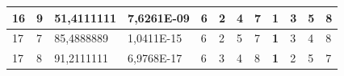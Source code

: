\documentclass[conference]{IEEEtran}
\begin{document}
\begin{table}[]
\begin{tabular}{|llll|llllllll|}
\multicolumn{1}{|l|}{16}                                                    & \multicolumn{1}{l|}{9}                                                        & \multicolumn{1}{l|}{51,4111111}                                                   & 7,6261E-09                     & \multicolumn{1}{l|}{6}                                                  & \multicolumn{1}{l|}{2}                                                  & \multicolumn{1}{l|}{4}                                                  & \multicolumn{1}{l|}{7}                                                  & \multicolumn{1}{l|}{\textbf{1}}                                         & \multicolumn{1}{l|}{3}                                                  & \multicolumn{1}{l|}{5}                                                  & 8                          \\ \hline
\multicolumn{1}{|l|}{17}                                                    & \multicolumn{1}{l|}{7}                                                        & \multicolumn{1}{l|}{85,4888889}                                                   & 1,0411E-15                     & \multicolumn{1}{l|}{6}                                                  & \multicolumn{1}{l|}{2}                                                  & \multicolumn{1}{l|}{5}                                                  & \multicolumn{1}{l|}{7}                                                  & \multicolumn{1}{l|}{\textbf{1}}                                         & \multicolumn{1}{l|}{3}                                                  & \multicolumn{1}{l|}{4}                                                  & 8                          \\ \hline
\multicolumn{1}{|l|}{17}                                                    & \multicolumn{1}{l|}{8}                                                        & \multicolumn{1}{l|}{91,2111111}                                                   & 6,9768E-17                     & \multicolumn{1}{l|}{6}                                                  & \multicolumn{1}{l|}{3}                                                  & \multicolumn{1}{l|}{4}                                                  & \multicolumn{1}{l|}{8}                                                  & \multicolumn{1}{l|}{\textbf{1}}                                         & \multicolumn{1}{l|}{2}                                                  & \multicolumn{1}{l|}{5}                                                  & 7                          \\ \hline

\end{tabular}
\end{table}
\end{document}
